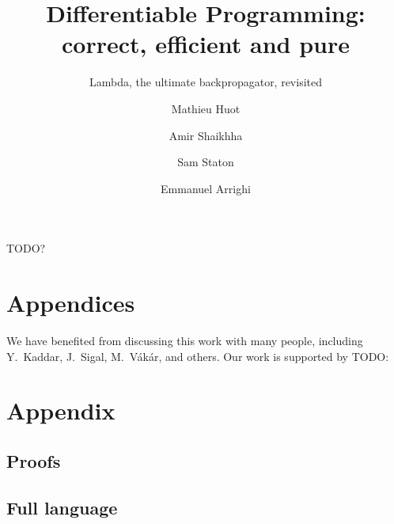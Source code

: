 \documentclass[acmsmall,review,anonymous]{acmart}\settopmatter{printfolios=true,printccs=false,printacmref=false}
\begin{document}
\title{Differentiable Programming: correct, efficient and pure}
\subtitle{Lambda, the ultimate backpropagator, revisited}

\author{Mathieu Huot}

\author{Amir Shaikhha}

\author{Sam Staton}

\author{Emmanuel Arrighi}

\renewcommand{\shortauthors}{Huot, et al.}



\begin{CCSXML}
TODO?
\end{CCSXML}


\maketitle












\section{Appendices}

\begin{acks}
We have benefited from discussing this work with many people, including Y.~Kaddar, J.~Sigal, M.~V\'ak\'ar, and others. 
Our work is supported by TODO:
\end{acks}

\nocite{*}


\appendix
\section{Appendix}

\subsection{Proofs} %
\label{sub:proofs}

\subsection{Full language} %
\label{sub:full_language}
\end{document}
